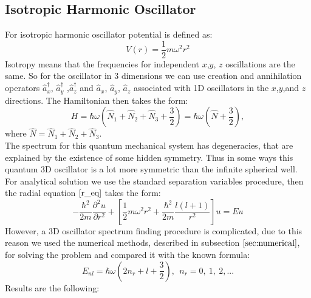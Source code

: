 \documentclass[a4paper, 12pt]{article}
\begin{document}
\subsection{Isotropic Harmonic Oscillator}
For isotropic harmonic oscillator potential is defined as:
$$V(r) = \frac{1}{2} m \omega^2 r^2 $$
Isotropy means that the frequencies for independent $x$,$y$, $z$ oscillations are the same. So for the oscillator in 3 dimensions we can use creation and annihilation operators $\hat{a}_x^\dag$, $\hat{a}_y^\dag$ ,$\hat{a}_z^\dag$ and $\hat{a}_x$,  $\hat{a}_y$, $\hat{a}_z$ associated with 1D oscillators in the $x$,$y$,and $z$ directions. The Hamiltonian then takes the form:
$$H = \hbar \omega (\hat{N}_1 + \hat{N}_2 + \hat{N}_3 + \frac{3}{2}) = \hbar \omega (\hat{N} + \frac{3}{2}),$$
where $\hat{N} = \hat{N}_1 + \hat{N}_2 + \hat{N}_3 .$\\
The spectrum for this quantum mechanical system has degeneracies, that are explained by the existence of some hidden symmetry. Thus in some ways this quantum 3D oscillator is a lot more symmetric than the infinite spherical well.\\
For analytical solution we use the standard separation variables procedure, then the radial equation  $\eqref{r_eq}$ takes the form:
$$-\frac{\hbar^2}{2m}\frac{\partial^2 u}{\partial r^2}+[\frac{1}{2} m \omega^2 r^2+\frac{\hbar^2}{2m}\frac{l(l+1)}{r^2}]u = Eu$$
However, a  3D oscillator spectrum finding procedure is complicated, due to this reason we used the numerical methods, described in subsection  $\ref{sec:numerical}$, for solving the problem and compared it with the known formula:
\begin{equation}
	E_{nl} = \hbar \omega (2 n_r +l+\frac{3}{2}),~~ n_r = 0,~1,~2,...
\end{equation}
Results are the following:
\end{document}
